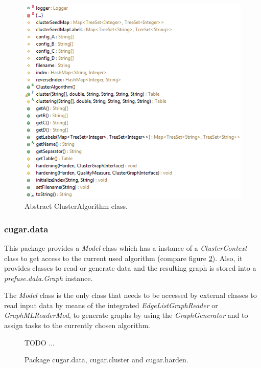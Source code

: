 \documentclass[a4paper, 11pt]{article}
\begin{document}
		\begin{figure}[h!]
			\centering \includegraphics[width =1\textwidth]{img/clusterAlgorithmClass.png}
			\caption{Abstract ClusterAlgorithm class.} \label{fig:algos}
		\end{figure}

	\subsubsection*{cugar.data}
		This package provides a \emph{Model} class which has a instance of a \emph{ClusterContext} class to get 
		access to the current used algorithm (compare figure \ref{cvk.data}). Also, it provides 
		classes to read or generate data and the resulting graph is stored into a  \emph{prefuse.data.Graph} instance.		 

		The \emph{Model} class is the only class that needs to be accessed by external classes to read input data by means of the integrated 
		\emph{EdgeListGraphReader} or \emph{GraphMLReaderMod}, 
		to generate graphs by using the \emph{GraphGenerator} and to assign tasks to the currently chosen algorithm.

		\begin{figure}[h!]
			TODO ...
			\caption{Package cugar.data, cugar.cluster and cugar.harden.} \label{cvk.data}
		\end{figure}
		
\end{document}
